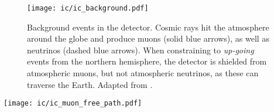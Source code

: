 \begin{figure}[htb]
    \texttt{[image: ic/ic\_background.pdf]}
    \caption[Background events]{Background events in the detector. Cosmic rays hit the atmosphere around the globe and produce muons (solid blue arrows), as well as neutrinos (dashed blue arrows). When constraining to \textit{up-going} events from the northern hemisphere, the detector is shielded from atmospheric muons, but not atmospheric neutrinos, as these can traverse the Earth. Adapted from \cite{Ahlers2018a}.}
\end{figure}

\begin{marginfigure}
    \texttt{[image: ic/ic\_muon\_free\_path.pdf]}
    \caption[Muon free path in ice]{Free path length for \SI{1}{\peta\eV} muons in ice. The mean free path in ice is slightly longer than in rock. From \cite{Chirkin2004}.}
\end{marginfigure}

